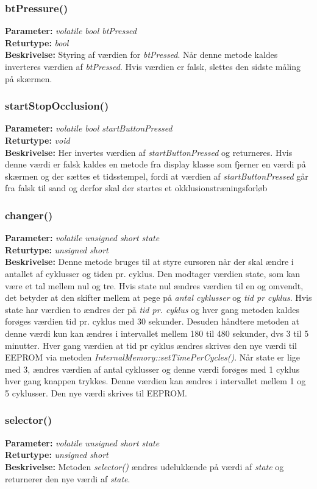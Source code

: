 \subsubsection{btPressure()}
\textbf{Parameter: } \textit{volatile bool btPressed}
\\ \textbf{Returtype: } \textit{bool}
\\ \textbf{Beskrivelse: } Styring af værdien for \textit{btPressed}. Når denne metode kaldes inverteres værdien af \textit{btPressed}. Hvis værdien er falsk, slettes den sidste måling på skærmen.

\subsubsection{startStopOcclusion()}
\textbf{Parameter: } \textit{volatile bool startButtonPressed}
\\ \textbf{Returtype: } \textit{void}
\\ \textbf{Beskrivelse: } Her invertes værdien af \textit{startButtonPressed} og returneres. Hvis denne værdi er falsk kaldes en metode fra display klasse som fjerner en værdi på skærmen og der sættes et tidsstempel, fordi at værdien af \textit{startButtonPressed} går fra falsk til sand og derfor skal der startes et okklusionstræningsforløb 

\subsubsection{changer()}
\textbf{Parameter: } \textit{volatile unsigned short state}
\\ \textbf{Returtype: } \textit{unsigned short}
\\ \textbf{Beskrivelse: } Denne metode bruges til at styre cursoren når der skal ændre i antallet af cyklusser og tiden pr. cyklus. Den modtager værdien state, som kan være et tal mellem nul og tre. Hvis state nul ændres værdien til en og omvendt, det betyder at den skifter mellem at pege på \textit{antal cyklusser} og \textit{tid pr cyklus}. 
Hvis state har værdien to ændres der på \textit{tid pr. cyklus }og hver gang metoden kaldes forøges værdien tid pr. cyklus med 30 sekunder. Desuden håndtere metoden at denne værdi kun kan ændres i intervallet mellem 180 til 480 sekunder, dvs 3 til 5 minutter. Hver gang værdien at tid pr cyklus ændres skrives den nye værdi til EEPROM via metoden \textit{InternalMemory::setTimePerCycles()}. 
Når state er lige med 3, ændres værdien af antal cyklusser og denne værdi forøges med 1 cyklus hver gang knappen trykkes. Denne værdien kan ændres i intervallet mellem 1 og 5 cyklusser. Den nye værdi skrives til EEPROM. 

\subsubsection{selector()}
\textbf{Parameter: } \textit{volatile unsigned short state}
\\ \textbf{Returtype: } \textit{unsigned short}
\\ \textbf{Beskrivelse: } Metoden \textit{selector()} ændres udelukkende på værdi af \textit{state} og returnerer den nye værdi af \textit{state}. 
